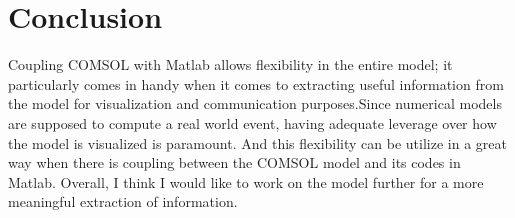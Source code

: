 \documentclass[DIV=calc, paper=a4, fontsize=11pt, twocolumn]{scrartcl}	 %
\begin{document}


\section*{Conclusion}
Coupling COMSOL with Matlab allows flexibility in the entire model; it particularly comes in handy when it comes to extracting useful information from the model for visualization and communication purposes.Since numerical models are supposed to compute a real world event, having adequate leverage over how the model is visualized is paramount. And this flexibility can be utilize in a great way when there is coupling between the COMSOL model and its codes in Matlab. Overall, I think I would like to work on the model further for a more meaningful extraction of information.
\end{document}
